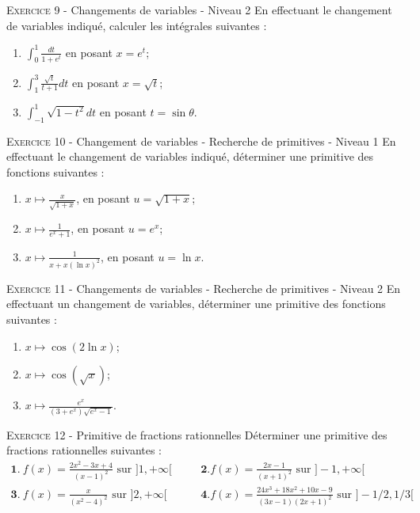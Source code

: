 

\vskip0.3cm\noindent\textsc{Exercice 9} - Changements de variables - Niveau 2
\vskip0.2cm
En effectuant le changement de variables indiqué, calculer les intégrales suivantes :
\begin{enumerate}
\item  $\displaystyle \int_0^1\frac{dt}{1+e^t}$ en posant $x=e^t$;
\item $\displaystyle \int_1^3\frac{\sqrt t}{t+1}dt$ en posant $x=\sqrt t$;
\item $\displaystyle \int_{-1}^1 \sqrt{1-t^2}dt$ en posant $t=\sin\theta$.
\end{enumerate}




\vskip0.3cm\noindent\textsc{Exercice 10} - Changement de variables - Recherche de primitives - Niveau 1
\vskip0.2cm
En effectuant le changement de variables indiqué, déterminer une primitive des fonctions suivantes :
\begin{enumerate}
\item $\displaystyle x\mapsto \frac{x}{\sqrt{1+x}}$, en posant $u=\sqrt{1+x}$;
\item $\displaystyle x\mapsto \frac{1}{e^x+1}$, en posant $u=e^x$;
\item $\displaystyle x\mapsto \frac{1}{x+x(\ln x)^2}$, en posant $u=\ln x$.
\end{enumerate}




\vskip0.3cm\noindent\textsc{Exercice 11} - Changements de variables - Recherche de primitives - Niveau 2
\vskip0.2cm
En effectuant un changement de variables, déterminer une primitive des fonctions suivantes :
\begin{enumerate}
\item $\displaystyle x\mapsto \cos(2\ln x)$;
\item $\displaystyle x\mapsto\cos(\sqrt x)$;
\item $\displaystyle x\mapsto \frac{e^x}{(3+e^x)\sqrt{e^x-1}}$.
\end{enumerate}




\vskip0.3cm\noindent\textsc{Exercice 12} - Primitive de fractions rationnelles
\vskip0.2cm
Déterminer une primitive des fractions rationnelles suivantes :
$$
\begin{array}{lll}
\mathbf 1.\ f(x)=\frac{2x^2-3x+4}{(x-1)^2}\textrm{ sur }]1,+\infty[&\quad&\mathbf 2. f(x)=\frac{2x-1}{(x+1)^2}\textrm{ sur }]-1,+\infty[ \\
\mathbf 3.\ f(x)=\frac{x}{(x^2-4)^2}\textrm{ sur }]2,+\infty[&&\mathbf 4. f(x)=\frac{24x^3+18x^2+10x-9}{(3x-1)(2x+1)^2}\textrm{ sur }]-1/2,1/3[
\end{array}
$$


